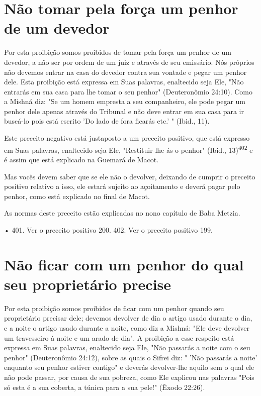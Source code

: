 \begin{itemize}
\begin{enumrate}
\begin{itemize}
\begin{itemize}
\begin{itemize}
\section{Não tomar pela força um penhor de um devedor}

Por esta proibição somos proibidos de tomar pela força um penhor de um
devedor, a não ser por ordem de um juiz e através de seu emissário. Nós
próprios não devemos entrar na casa do devedor contra sua vontade e
pe­gar um penhor dele. Esta proibição está expressa em Suas palavras,
enaltecido seja Ele, "Não entrarás em sua casa para lhe tomar o seu
penhor" (Deuteronô­mio 24:10). Como a Mishná diz: "Se um homem empresta
a seu companheiro, ele pode pegar um penhor dele apenas através do
Tribunal e não deve entrar em sua casa para ir buscá-lo pois está
escrito 'Do lado de fora ficarás etc.' " (Ibid., 11).

Este preceito negativo está justaposto a um preceito positivo, que está
expresso em Suas palavras, enaltecido seja Ele, "Restituir-lhe-ás o
penhor" (Ibid., 13)\textsuperscript{402} e é assim que está explicado na
Guemará de Macot.

Mas vocês devem saber que se ele não o devolver, deixando de cum­prir o
preceito positivo relativo a isso, ele estará sujeito ao açoitamento e
deve­rá pagar pelo penhor, como está explicado no final de Macot.


As normas deste preceito estão explicadas no nono capítulo de Baba
Metzia.

• 401. Ver o preceito positivo 200. 402. Ver o preceito positivo 199.



\section{Não ficar com um penhor do qual seu proprietário precise}

Por esta proibição somos proibidos de ficar com um penhor quan­do seu
proprietário precisar dele; devemos devolver de dia o artigo usado
du­rante o dia, e a noite o artigo usado durante a noite, como diz a
Mishná: "Ele deve devolver um travesseiro à noite e um arado de dia". A
proibição a esse respeito está expressa em Suas palavras, enaltecido
seja Ele, "Não passarás a noite com o seu penhor" (Deuteronômio 24:12),
sobre as quais o Sifrei diz: " 'Não passarás a noite' enquanto seu
penhor estiver contigo" e deverás devolver-lhe aquilo sem o qual ele não
pode passar, por causa de sua pobreza, como Ele explicou nas palavras
"Pois só esta é a sua coberta, a túnica para a sua pele!" (Êxodo 22:26).


\end{itemize}
\end{itemize}
\end{itemize}
\end{enumrate}
\end{itemize}
